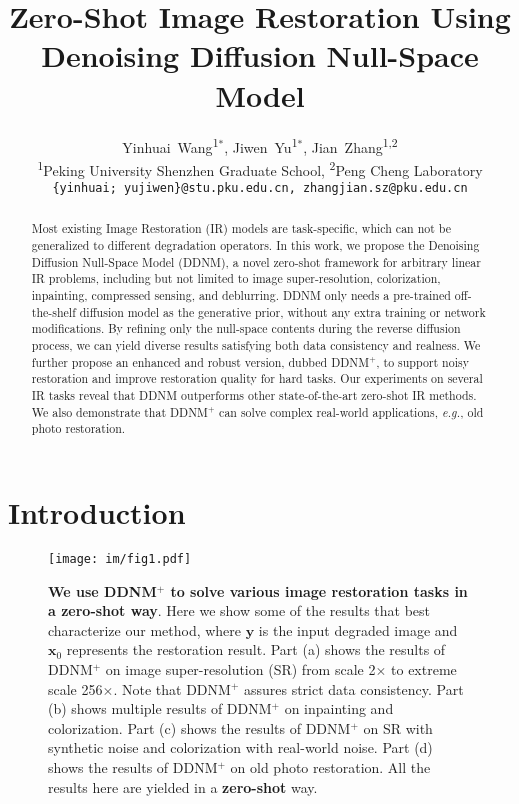 \documentclass{article} \usepackage{iclr2023_conference,times}
\title{Zero-Shot Image Restoration Using\\ Denoising Diffusion Null-Space Model}
\author{Yinhuai~Wang\textsuperscript{\rm 1}$^*$,
Jiwen~Yu\textsuperscript{\rm 1}$^*$,
Jian~Zhang\textsuperscript{\rm 1,2}\\
\textsuperscript{\rm 1}Peking University Shenzhen Graduate School, \textsuperscript{\rm 2}Peng Cheng Laboratory\\
\texttt{\{yinhuai; yujiwen\}@stu.pku.edu.cn, zhangjian.sz@pku.edu.cn} \\
}
\begin{document}
\maketitle

\begin{abstract}
Most existing Image Restoration (IR) models are task-specific, which can not be generalized to different degradation operators. In this work, we propose the Denoising Diffusion Null-Space Model (DDNM), a novel zero-shot framework for arbitrary linear IR problems, including but not limited to image super-resolution, colorization, inpainting, compressed sensing, and deblurring. DDNM only needs a pre-trained off-the-shelf diffusion model as the generative prior, without any extra training or network modifications. By refining only the null-space contents during the reverse diffusion process, we can yield diverse results satisfying both data consistency and realness. We further propose an enhanced and robust version, dubbed DDNM$^+$, to support noisy restoration and improve restoration quality for hard tasks. Our experiments on several IR tasks reveal that DDNM outperforms other state-of-the-art zero-shot IR methods. We also demonstrate that DDNM$^+$ can solve complex real-world applications, \textit{e.g.}, old photo restoration. 
\end{abstract}

\vspace{-0.1cm}
\section{Introduction}

\begin{figure*}[hb]
  \centering
  \vspace{-0.1cm}
  \texttt{[image: im/fig1.pdf]}
  \vspace{-0.7cm}
  \caption{\textbf{We use DDNM$^+$ to solve various image restoration tasks in a zero-shot way}.  Here we show some of the results that best characterize our method, where $\mathbf{y}$ is the input degraded image and $\mathbf{x}_0$ represents the restoration result. Part (a) shows the results of DDNM$^+$ on image super-resolution (SR) from scale 2$\times$ to extreme scale 256$\times$. Note that DDNM$^+$ assures strict data consistency. Part (b) shows multiple results of DDNM$^+$ on inpainting and colorization. Part (c) shows the results of DDNM$^+$ on SR with synthetic noise and colorization with real-world noise. Part (d) shows the results of DDNM$^+$ on old photo restoration. All the results here are yielded in a \textbf{zero-shot} way.}
   \vspace{-0.2cm}
\label{fig:front} 
\end{figure*}
\end{document}
